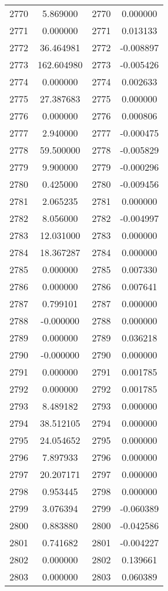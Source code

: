 \documentclass[12pt]{article}
\begin{document}
\begin{longtable}{@{}cccc@{}}
2770 & 5.869000 & 2770 & 0.000000 \\
2771 & 0.000000 & 2771 & 0.013133 \\
2772 & 36.464981 & 2772 & -0.008897 \\
2773 & 162.604980 & 2773 & -0.005426 \\
2774 & 0.000000 & 2774 & 0.002633 \\
2775 & 27.387683 & 2775 & 0.000000 \\
2776 & 0.000000 & 2776 & 0.000806 \\
2777 & 2.940000 & 2777 & -0.000475 \\
2778 & 59.500000 & 2778 & -0.005829 \\
2779 & 9.900000 & 2779 & -0.000296 \\
2780 & 0.425000 & 2780 & -0.009456 \\
2781 & 2.065235 & 2781 & 0.000000 \\
2782 & 8.056000 & 2782 & -0.004997 \\
2783 & 12.031000 & 2783 & 0.000000 \\
2784 & 18.367287 & 2784 & 0.000000 \\
2785 & 0.000000 & 2785 & 0.007330 \\
2786 & 0.000000 & 2786 & 0.007641 \\
2787 & 0.799101 & 2787 & 0.000000 \\
2788 & -0.000000 & 2788 & 0.000000 \\
2789 & 0.000000 & 2789 & 0.036218 \\
2790 & -0.000000 & 2790 & 0.000000 \\
2791 & 0.000000 & 2791 & 0.001785 \\
2792 & 0.000000 & 2792 & 0.001785 \\
2793 & 8.489182 & 2793 & 0.000000 \\
2794 & 38.512105 & 2794 & 0.000000 \\
2795 & 24.054652 & 2795 & 0.000000 \\
2796 & 7.897933 & 2796 & 0.000000 \\
2797 & 20.207171 & 2797 & 0.000000 \\
2798 & 0.953445 & 2798 & 0.000000 \\
2799 & 3.076394 & 2799 & -0.060389 \\
2800 & 0.883880 & 2800 & -0.042586 \\
2801 & 0.741682 & 2801 & -0.004227 \\
2802 & 0.000000 & 2802 & 0.139661 \\
2803 & 0.000000 & 2803 & 0.060389 \\

\end{longtable}
\end{document}

